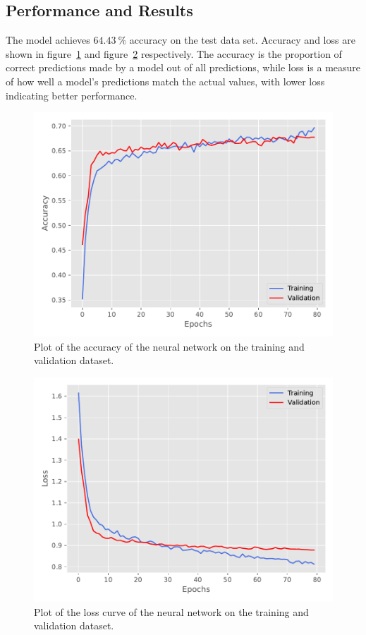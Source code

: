 \documentclass[
  12pt,
  bibliography=totoc,     %
  captions=tableheading,  %
  titlepage=firstiscover, %
]{scrartcl}
\begin{document}
\subsection{Performance and Results}
The model achieves $\SI{64.43}{\percent}$ accuracy on the test data set. Accuracy and loss are shown in figure~\ref{fig:nn_acc} and figure~\ref{fig:nn_loss} respectively.
The accuracy is the proportion of correct predictions made by a model out of all predictions, while loss is a measure of how well a model's predictions match the actual
values, with lower loss indicating better performance.
\FloatBarrier
\begin{figure}[H]
  \centering
  \includegraphics[scale=0.7]{figures/NN/Acc.pdf}
  \caption{Plot of the accuracy of the neural network on the training and validation dataset.}
  \label{fig:nn_acc}
\end{figure}
\begin{figure}[ht]
  \centering
  \includegraphics[scale=0.7]{figures/NN/Loss.pdf}
  \caption{Plot of the loss curve of the neural network on the training and validation dataset.}
  \label{fig:nn_loss}
\end{figure}
\end{document}
